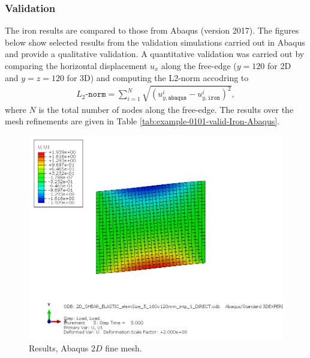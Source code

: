 \subsubsection{Validation}
%
The iron results are compared to those from Abaqus (version 2017). The figures below show selected results from the validation simulations carried out in Abaqus and provide a qualitative validation. A quantitative validation was carried out by comparing the horizontal displacement $u_x$ along the free-edge ($y=120$ for 2D and $y=z=120$ for 3D) and computing the L2-norm accodring to
\begin{align}
    L_2\texttt{-norm} = \sum_{i=1}^{N} \sqrt{\left(u_{y,\texttt{abaqus}}^i-u_{y,\texttt{iron}}^i  \right)^2},
\end{align}
where $N$ is the total number of nodes along the free-edge. The results over the mesh refinements are given in Table \ref{tab:example-0101-valid-Iron-Abaqus}.
%
\begin{figure}[h!]
    \centering 
    \includegraphics[width=\columnwidth]{examples/example-0102/doc/figures/2D_SHEAR_ELASTIC_elemSize_5_160x120mm_intp_1_DIRECTU1.png} 
    \caption{Results, Abaqus $2D$ fine mesh.}
    \label{example-0102-abaqus-2D-fig}
\end{figure}
%
